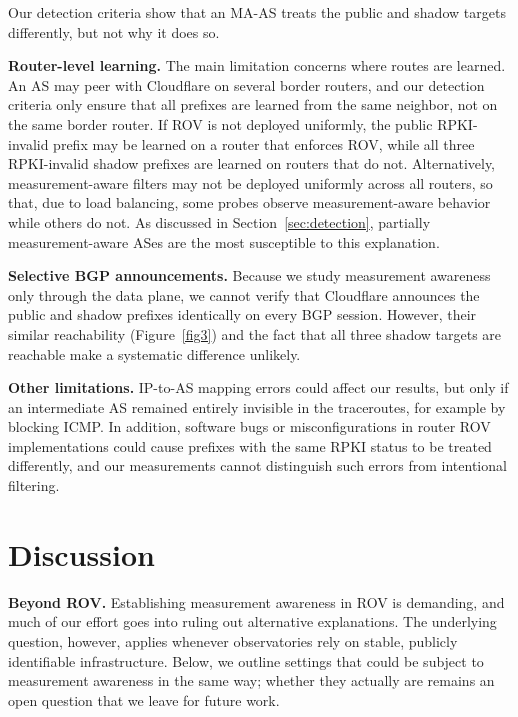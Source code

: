 \documentclass[sigconf, 10pt]{acmart}
\begin{document}
Our detection criteria show that an MA-AS treats the public and shadow targets differently, but not why it does so.

\noindent\textbf{Router-level learning.} The main limitation concerns where routes are learned. An AS may peer with Cloudflare on several border routers, and our detection criteria only ensure that all prefixes are learned from the same neighbor, not on the same border router. If ROV is not deployed uniformly, the public RPKI-invalid prefix may be learned on a router that enforces ROV, while all three RPKI-invalid shadow prefixes are learned on routers that do not. Alternatively, measurement-aware filters may not be deployed uniformly across all routers, so that, due to load balancing, some probes observe measurement-aware behavior while others do not. As discussed in Section~\ref{sec:detection}, partially measurement-aware ASes are the most susceptible to this explanation.

\noindent\textbf{Selective BGP announcements.} Because we study measurement awareness only through the data plane, we cannot verify that Cloudflare announces the public and shadow prefixes identically on every BGP session. However, their similar reachability (Figure~\ref{fig3}) and the fact that all three shadow targets are reachable make a systematic difference unlikely.

\noindent\textbf{Other limitations.} IP-to-AS mapping errors could affect our results, but only if an intermediate AS remained entirely invisible in the traceroutes, for example by blocking ICMP. In addition, software bugs or misconfigurations in router ROV implementations could cause prefixes with the same RPKI status to be treated differently, and our measurements cannot distinguish such errors from intentional filtering.

\section{Discussion}

\noindent\textbf{Beyond ROV.} Establishing measurement awareness in ROV is demanding, and much of our effort goes into ruling out alternative explanations. The underlying question, however, applies whenever observatories rely on stable, publicly identifiable infrastructure. Below, we outline settings that could be subject to measurement awareness in the same way; whether they actually are remains an open question that we leave for future work. 
\end{document}
